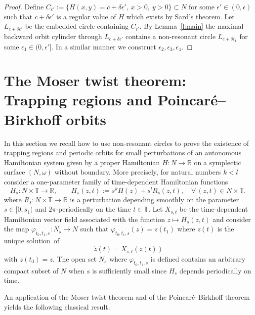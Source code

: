 \documentclass[AHL,Unicode,longabstracts,published]{cedram}
\newcommand{\R}{\mathbb{R}}
\newcommand{\T}{\mathbb{T}}
\let\oldforall\forall
\renewcommand*{\forall}{\mathrel{\oldforall}}
\begin{document}
\begin{proof}
Define $C_{\epsilon'}:=\{H(x,y)=c+\delta\epsilon',\ x>0,\ y>0\}\subset N$ for some $\epsilon'\in(0,\epsilon)$ such that $c+\delta\epsilon'$ is a regular value of $H$ which exists by Sard's theorem. Let $L_{c+\delta\epsilon'}$ be the embedded circle containing $C_{\epsilon'}$. By Lemma~\ref{l:main} the maximal backward orbit cylinder through $L_{c+\delta\epsilon'}$ contains a non-resonant circle $L_{c+\delta\epsilon_1}$ for some $\epsilon_1\in(0,\epsilon']$. In a similar manner we construct $\epsilon_2,\epsilon_3,\epsilon_4$.
\end{proof}



\section{The Moser twist theorem: Trapping regions and Poincaré--Birkhoff orbits}
\label{s:Moser}

In this section we recall how to use non-resonant circles to prove the existence of trapping regions and periodic orbits for small perturbations of an autonomous Hamiltonian system given by a proper Hamiltonian $H:N\to\R$ on a symplectic surface $(N,\omega)$ without boundary. More precisely, for natural numbers $k<l$ consider a one-parameter family of time-dependent Hamiltonian functions
\begin{equation}\label{e:Hs}
H_s:N\times\T\to\R,\qquad H_s(z,t):=s^kH(z)+s^lR_s(z,t),\quad \forall\,(z,t)\in N\times \T,
\end{equation}
where $R_s:N\times \T\to\R$ is a perturbation depending smoothly on the parameter $s\in[0,s_1)$ and $2\pi$-periodically on the time $t\in\T$. Let $X_{s,t}$ be the time-dependent Hamiltonian vector field associated with the function $z\mapsto H_s(z,t)$ and consider the map $\varphi_{t_0,t_1,s}:N_s\to N$ such that $\varphi_{t_0,t_1,s}(z)=z(t_1)$ where $z(t)$ is the unique solution~of
\begin{equation}\label{e:nonaut}
\dot z(t)=X_{s,t}(z(t))
\end{equation}
with $z(t_0)=z$. The open set $N_s$ where $\varphi_{t_0,t_1,s}$ is defined contains an arbitrary compact subset of $N$ when $s$ is sufficiently small since $H_s$ depends periodically on time.

An application of the Moser twist theorem and of the Poincaré--Birkhoff theorem yields the following classical result.
\end{document}
